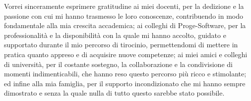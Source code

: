 Vorrei sinceramente esprimere gratitudine ai miei docenti, per la dedizione e la passione con cui mi hanno
trasmesso le loro conoscenze, contribuendo in modo fondamentale alla mia crescita accademica;
ai colleghi di Proge-Software, per la professionalità e la disponibilità con la quale mi hanno accolto,
guidato e supportato durante il mio percorso di tirocinio, permettendomi di mettere in pratica quanto appreso
e di acquisire nuove competenze;
ai miei amici e colleghi di università, per il costante sostegno, la collaborazione e la condivisione
di momenti indimenticabili, che hanno reso questo percorso più ricco e stimolante;
ed infine alla mia famiglia, per il supporto incondizionato che mi hanno
sempre dimostrato e senza la quale nulla di tutto questo sarebbe stato possibile.